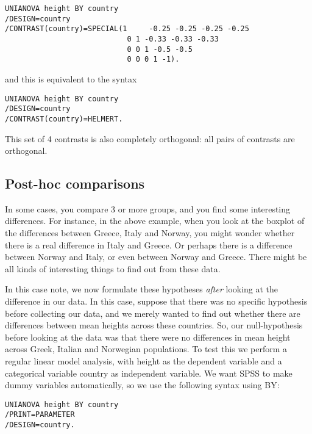\begin{verbatim}
UNIANOVA height BY country
/DESIGN=country
/CONTRAST(country)=SPECIAL(1     -0.25 -0.25 -0.25 -0.25
                            0 1 -0.33 -0.33 -0.33
                            0 0 1 -0.5 -0.5
                            0 0 0 1 -1).
\end{verbatim}

and this is equivalent to the syntax 

\begin{verbatim}
UNIANOVA height BY country
/DESIGN=country
/CONTRAST(country)=HELMERT.
\end{verbatim}


This set of 4 contrasts is also completely orthogonal: all pairs of contrasts are orthogonal.





\subsection{Post-hoc comparisons}

In some cases, you compare 3 or more groups, and you find some interesting differences. For instance, in the above example, when you look at the boxplot of the  differences between Greece, Italy and Norway, you might wonder whether there is a real difference in Italy and Greece. Or perhaps there is a difference between Norway and Italy, or even between Norway and Greece. There might be all kinds of interesting things to find out from these data.

In this case note, we now formulate these hypotheses \textit{after} looking at the difference in our data. In this case, suppose that there was no specific hypothesis before collecting our data, and we merely wanted to find out whether there are differences between mean heights across these countries. So, our null-hypothesis before looking at the data was that there were no differences in mean height across Greek, Italian and Norwegian populations. To test this we perform a regular linear model analysis, with height as the dependent variable and a categorical variable country as independent variable. We want SPSS to make dummy variables automatically, so we use the following syntax using BY:

\begin{verbatim}
UNIANOVA height BY country
/PRINT=PARAMETER
/DESIGN=country.
\end{verbatim}



